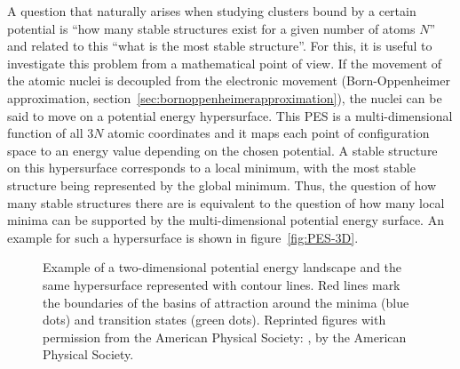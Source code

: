 A question that naturally arises when studying clusters bound by a certain
potential is ``how many stable structures exist for a given number of atoms
$N$'' and related to this ``what is the most stable structure''. For this, it is
useful to investigate this problem from a mathematical point of view. If the
movement of the atomic nuclei is decoupled from the electronic movement
(Born-Oppenheimer approximation,
section~\ref{sec:bornoppenheimerapproximation}), the nuclei can be said to move
on a potential energy hypersurface. This \ac{PES} is a multi-dimensional
function of all $3N$ atomic coordinates and it maps each point of configuration
space to an energy value depending on the chosen potential. A stable structure
on this hypersurface corresponds to a local minimum, with the most stable
structure being represented by the global minimum. Thus, the question of how
many stable structures there are is equivalent to the question of how many local
minima can be supported by the multi-dimensional potential energy surface. An
example for such a hypersurface is shown in figure~\ref{fig:PES-3D}.
%
\begin{figure}[htb]
    \centering
    \hspace{0.05\textwidth}
    \caption{\protect{} Example of a two-dimensional potential energy landscape and \protect{} the same hypersurface represented with contour lines. Red lines mark the boundaries of the basins of attraction around the minima (blue dots) and transition states (green dots). Reprinted figures with permission from the American Physical Society: \autocite{Massen_Powerlawdistributionsareas_2007},  by the American Physical Society.}
    \label{fig:PES}
\end{figure}
